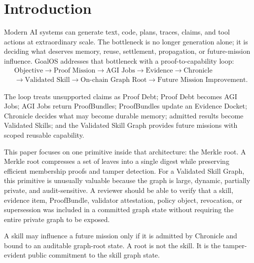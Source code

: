 \documentclass[11pt,letterpaper]{article}
\begin{document}
\section{Introduction}
Modern AI systems can generate text, code, plans, traces, claims, and tool actions at extraordinary scale. The bottleneck is no longer generation alone; it is deciding what deserves memory, reuse, settlement, propagation, or future-mission influence. GoalOS addresses that bottleneck with a proof-to-capability loop:
\[
\begin{aligned}
&\text{Objective} \to \text{Proof Mission} \to \text{AGI Jobs} \to \text{Evidence} \to \text{Chronicle}\\
&\to \text{Validated Skill} \to \text{On-chain Graph Root} \to \text{Future Mission Improvement}.
\end{aligned}
\]

The loop treats unsupported claims as Proof Debt; Proof Debt becomes AGI Jobs; AGI Jobs return ProofBundles; ProofBundles update an Evidence Docket; Chronicle decides what may become durable memory; admitted results become Validated Skills; and the Validated Skill Graph provides future missions with scoped reusable capability.

This paper focuses on one primitive inside that architecture: the Merkle root. A Merkle root compresses a set of leaves into a single digest while preserving efficient membership proofs and tamper detection. For a Validated Skill Graph, this primitive is unusually valuable because the graph is large, dynamic, partially private, and audit-sensitive. A reviewer should be able to verify that a skill, evidence item, ProofBundle, validator attestation, policy object, revocation, or supersession was included in a committed graph state without requiring the entire private graph to be exposed.

\begin{thesisbox}
A skill may influence a future mission only if it is admitted by Chronicle and bound to an auditable graph-root state. A root is not the skill. It is the tamper-evident public commitment to the skill graph state.
\end{thesisbox}
\end{document}

